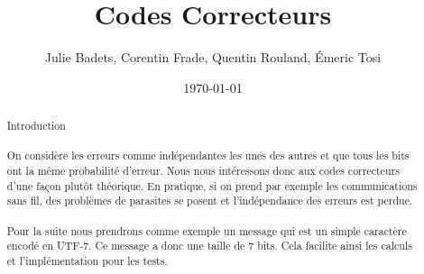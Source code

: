 \documentclass[a4paper,11pt]{report}
\title{Codes Correcteurs}
\author{Julie Badets, Corentin Frade, Quentin Rouland, Émeric Tosi}
\date{\today}
\begin{document}
    \maketitle{}


    \begin{abstract}
        \paragraph{}
Introduction
        \paragraph{}
On considère les erreurs comme indépendantes les unes des autres et que tous les bits ont la même probabilité d'erreur.
Nous nous intéressons donc aux codes correcteurs d'une façon plutôt théorique.
En pratique, si on prend par exemple les communications sans fil, des problèmes de parasites se posent et l'indépendance des erreurs est perdue.
        \paragraph{}
Pour la suite nous prendrons comme exemple un message qui est un simple caractère encodé en UTF-7.
Ce message a donc une taille de 7 bits.
Cela facilite ainsi les calculs et l'implémentation pour les tests.
    \end{abstract}


    \setcounter{tocdepth}{1}

    \renewcommand{\contentsname}{Sommaire}

    \tableofcontents{}

    

    

    

    

    

    \listoffigures
\end{document}
